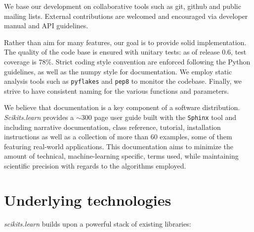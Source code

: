 \documentclass[twoside,11pt]{article}
\begin{document}
\smallskip
{}
%
We base our development on collaborative tools such as git, github and
public mailing lists. External contributions are welcomed and
encouraged via developer manual and API guidelines.

\smallskip
{}
%
Rather than aim for many features, our goal is to provide solid
implementation. The quality of the code base is ensured with unitary
tests: as of release 0.6, test coverage is 78\%. Strict coding style
convention are enforced following the Python guidelines, as well as the
numpy style for documentation. We employ static analysis tools such as
{\tt pyflakes} and {\tt pep8} to monitor the codebase. Finally, we strive
to have consistent naming for the various functions and parameters.




\smallskip
{}
%
We believe that documentation is a key component of a software
distribution. \emph{Scikits.learn} provides a $\sim$300 page user
guide built with the {\tt Sphinx} tool and including narrative
documentation, class reference, tutorial, installation instructions as
well as a collection of more than 60 examples, some of them featuring
real-world applications. This documentation aims to minimize the amount
of technical, machine-learning specific, terms used, while maintaining
scientific precision with regards to the algorithms employed.



\section{Underlying technologies}


\emph{scikits.learn} builds upon a powerful stack of existing libraries:
\end{document}
